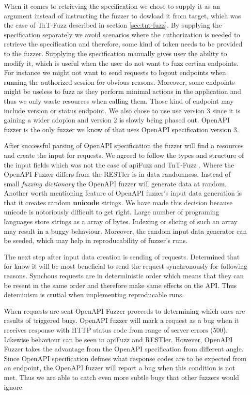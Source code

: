 When it comes to retrieving the specification we chose to supply it as an argument instead of instructing the fuzzer to dowload it from target, which was the case of TnT-Fuzz described in section \ref{sec:tnt-fuzz}. By supplying the specification separately we avoid scenarios where the authorization is needed to retrieve the specification and therefore, some kind of token needs to be provided to the fuzzer. Supplying the specification manually gives user the ability to modify it, which is useful when the user do not want to fuzz certian endpoints. For instance we might not want to send requests to logout endpoints when running the authorized session for obvious reasons. Moreover, some endpoints might be useless to fuzz as they perform minimal actions in the application and thus we only waste resources when calling them. Those kind of endpoint may include version or status endpoint. We also chose to use use version 3 since it is gaining a wider adopion and version 2 is slowly being phased out. OpenAPI fuzzer is the only fuzzer we know of that uses OpenAPI specification version 3.

After successful parsing of OpenAPI specification the fuzzer will find a resources and create the input for requests. We agreed to follow the types and structure of the input fields which was not the case of apiFuzz \cite{apiFuzz2020github} and TnT-Fuzz \cite{tntFuzzer2020github}. Where the OpenAPI Fuzzer differs from the RESTler \cite{atlidakis2019restler} is in data randomness. Instead of small \textit{fuzzing dictionary} the OpenAPI fuzzer will generate data at random. Another worth mentioning feature of OpenAPI fuzzer's input data generation is that it creates random \textbf{unicode} strings. We have made this decision because unicode is notoriously difficult to get right. Large number of programing languages store strings as a array of bytes. Indexing or slicing of such an array may result in a buggy behaviour. Moreover, the random input data generator can be seeded, which may help in reproducability of fuzzer's runs.

The next step after input data creation is sending of requests. Determined that for know it will be most beneficial to send the request synchronously for following reasons. Synchous requests are in deterministic order which means that they can be resent in the same order and therefore make same effects on the API. Thus deteminism is crutial when implementing reproducable runs.

When requests are sent OpenAPI Fuzzer proceeds to determining which ones are results of triggered bugs. OpenAPI fuzzer will mark a request as a bug when it receives response with HTTP status code from range of server errors (500). Likewise behaviour can be seen in apiFuzz and RESTler. However, OpenAPI Fuzzer takes the advantage from the OpenAPI specification from different angle. Since OpenAPI specification defines what response codes are to be expected from an endpoint, the OpenAPI fuzzer will report a bug when this condition is not met. Thus we are able to catch even more subtle bugs that other fuzzers would ignore.

